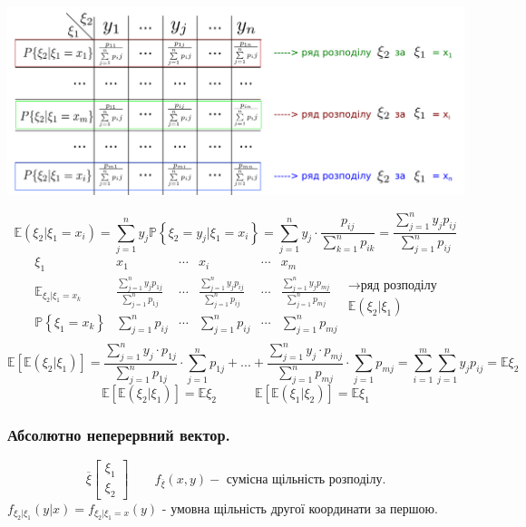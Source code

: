 \begin{center}
\includegraphics[scale=0.28]{images/20.png} \end{center}
$$
\mathbb{E}(\xi_2 | \xi_1 = x_i)  =  \sum\limits_{j = 1}^{ n}{ y_j \mathbb{P} \left\lbrace \xi_2 = y_j | \xi_1 = x_i \right\rbrace } =  \sum\limits_{j = 1}^{n}{ y_{j} \cdot \frac{p_{ij} }{  \sum\limits_{k = 1}^{ n}{p_{ik}}}}= \frac{  \sum\limits_{j = 1}^{ n}{ y_j p_{ij}}}{  \sum\limits_{j = 1}^{n}{ p_{ij}}}
$$
$$
\begin{matrix}
	\xi_1 & x_1 & \cdots  &x_i & \cdots & x_m \\
	\mathbb{E}_{\xi_2 | \xi_1=x_k}  &  \frac{  \sum\limits_{j = 1}^{ n}{ y_j p_{1j}}}{  \sum\limits_{j = 1}^{n}{ p_{1j}}}  & \cdots  &\frac{  \sum\limits_{j = 1}^{ n}{ y_j p_{ij}}}{  \sum\limits_{j = 1}^{n}{ p_{ij}}}  & \cdots & \frac{  \sum\limits_{j = 1}^{ n}{ y_j p_{mj}}}{  \sum\limits_{j = 1}^{n}{ p_{mj}}}  \\
	\mathbb{P} \left\lbrace \xi_1 = x_k \right\rbrace &   \sum\limits_{j = 1}^{n}{ p_{ij}} & \cdots  &\sum\limits_{j = 1}^{n}{ p_{ij}} & \cdots & \sum\limits_{j = 1}^{n}{ p_{mj}} \\
\end{matrix}
\begin{gathered}
\longrightarrow \text{ряд розподілу}\\
\mathbb{E}(\xi_2| \xi_1)
\end{gathered}
$$
$$
\mathbb{E}[ \mathbb{E} (\xi_2 | \xi_1)] =
\frac{  \sum\limits_{j = 1}^{n}  {y_j \cdot p_{1j}} }   {  \sum\limits_{j = 1}^{ n}{ p_{1j}}} \cdot  \sum\limits_{j = 1}^{ n}{ p_{1j}}+ ... +
\frac{  \sum\limits_{j = 1}^{n}{y_j \cdot p_{mj}} }   {  \sum\limits_{j = 1}^{ n}{ p_{mj}}} \cdot  \sum\limits_{j = 1}^{ n}{ p_{mj}} =  \sum\limits_{i = 1}^{m}{  \sum\limits_{j =1 }^{ n}{ y_j p_{ij}}} = \mathbb{E}\xi_2
$$
$$
\mathbb{E}[ \mathbb{E} (\xi_2 | \xi_1)] = \mathbb{E}  \xi_2  \quad \quad \quad \mathbb{E}[ \mathbb{E} (\xi_1 | \xi_2)] = \mathbb{E}  \xi_1
$$
\subsubsection{Абсолютно неперервний вектор.}
$$
\overline{\xi}  \begin{bmatrix}
 \xi_1 \\ \xi_2
\end{bmatrix} \qquad f_{\overline{\xi}} (x,y) - \text{ сумісна щільність розподілу.}
$$
$
f_{\xi_2 | \xi_1} (y|x) = f_{\xi_2| \xi_1 = x} (y)
$ - умовна щільність другої координати за першою.\\

